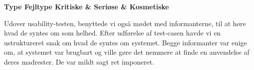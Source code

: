 \textbf{
           						 {Type}
       {Fejltype             	}{Kritiske   & Seriøse   & Kosmetiske}{
}
}

Udover usability-testen, benyttede vi også mødet med informanterne, til at høre hvad de syntes om \Foodl som helhed. Efter udførelse af test-casen havde vi en ustruktureret snak om hvad de syntes om systemet. Begge informanter var enige om, at systemet var brugbart og ville gøre det nemmere at finde en anvendelse af deres madrester. De var mildt sagt ret imponeret.